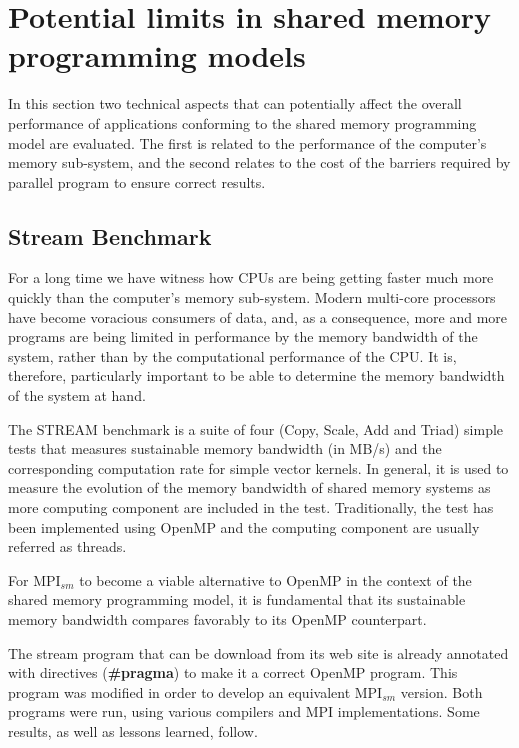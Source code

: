 \section{Potential limits in shared memory programming models}

In this section two technical aspects that can potentially affect the overall performance of applications conforming to the shared memory programming model are evaluated. The first is related to the performance of the computer's memory sub-system, and the second relates to the cost of the barriers required by parallel program to ensure correct results.


\subsection*{Stream Benchmark}

For a long time we have witness how CPUs are being getting faster much more quickly than the computer's memory sub-system. Modern multi-core processors have become voracious consumers of data, and, as a consequence, more and more programs are being limited in performance by the memory bandwidth of the system, rather than by the computational performance of the CPU\cite{McCalpin2007}. It is, therefore, particularly important to be able to determine the memory bandwidth of the system at hand. 

\medskip


The STREAM benchmark\cite{McCalpin2007} is a suite of four (Copy, Scale, Add and Triad) simple tests that measures sustainable memory bandwidth (in MB/s) and the corresponding computation rate for simple vector kernels. In general, it is used to measure the evolution of the memory bandwidth of shared memory systems as more computing component are included in the test. Traditionally, the test has been implemented using OpenMP and the computing component are usually referred as threads.

\medskip

For MPI$_{sm}$ to become a viable alternative to OpenMP in the context of the shared memory programming model, it is fundamental that its sustainable memory bandwidth compares favorably to its OpenMP counterpart.

\medskip

The stream program that can be download from its web site \cite{McCalpin2007} is already annotated with directives (\textbf{\#pragma}) to make it a correct OpenMP program. This program was modified in order to develop an equivalent  MPI$_{sm}$ version. Both programs were run, using various compilers and MPI implementations. Some results, as well as lessons learned, follow.

